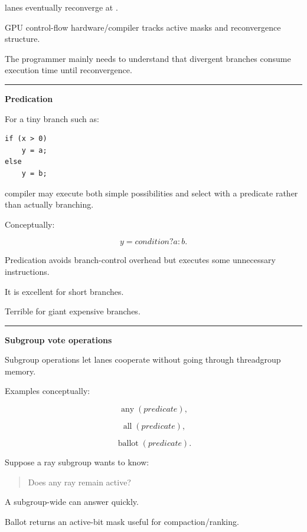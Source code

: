 lanes eventually reconverge at .

GPU control-flow hardware/compiler tracks active masks and reconvergence structure.

The programmer mainly needs to understand that divergent branches consume execution time until reconvergence.

\begin{center}\rule{0.5\linewidth}{0.5pt}\end{center}

\textbf{Predication}

For a tiny branch such as:

\protect{}\label{whgcgz}%
\begin{verbatim}
if (x > 0)
    y = a;
else
    y = b;
\end{verbatim}

compiler may execute both simple possibilities and select with a predicate rather than actually branching.

Conceptually:

\[
y=
condition?a:b.
\]

Predication avoids branch-control overhead but executes some unnecessary instructions.

It is excellent for short branches.

Terrible for giant expensive branches.

\begin{center}\rule{0.5\linewidth}{0.5pt}\end{center}

\textbf{Subgroup vote operations}

Subgroup operations let lanes cooperate without going through threadgroup memory.

Examples conceptually:

\[
\operatorname{any}(predicate),
\]

\[
\operatorname{all}(predicate),
\]

\[
\operatorname{ballot}(predicate).
\]

Suppose a ray subgroup wants to know:

\begin{quote}
Does any ray remain active?
\end{quote}

A subgroup-wide  can answer quickly.

Ballot returns an active-bit mask useful for compaction/ranking.

